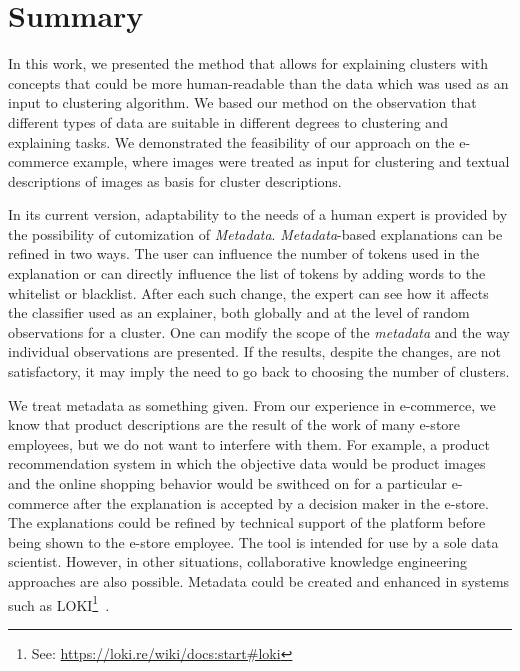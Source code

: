 \documentclass[
 twocolumn,
 hf,
]{ceurart}
\begin{document}
\section{Summary}
\label{sec:summary}
In this work, we presented the method that allows for explaining clusters with concepts that could be more human-readable than the data which was used as an input to clustering algorithm.
We based our method on the observation that different types of data are suitable in different degrees to clustering and explaining tasks.
We demonstrated the feasibility of our approach on the e-commerce example, where images were treated as input for clustering and textual descriptions of images as basis for cluster descriptions.

In its current version, adaptability to the needs of a human expert is provided by the possibility of cutomization of \textit{Metadata}.
\textit{Metadata}-based explanations can be refined in two ways.
The user can influence the number of tokens used in the explanation or can directly influence the list of tokens by adding words to the whitelist or blacklist.
After each such change, the expert can see how it affects the classifier used as an explainer, both globally and at the level of random observations for a cluster.
One can modify the scope of the \textit{metadata} and the way individual observations are presented.
If the results, despite the changes, are not satisfactory, it may imply the need to go back to choosing the number of clusters.

We treat metadata as something given.
From our experience in e-commerce, we know that product descriptions are the result of the work of many e-store employees, but we do not want to interfere with them.
For example, a product recommendation system in which the objective data would be product images and the online shopping behavior would be swithced on for a particular e-commerce after the explanation is accepted by a decision maker in the e-store.
The explanations could be refined by technical support of the platform before being shown to the e-store employee.
The tool is intended for use by a sole data scientist.
However, in other situations, collaborative knowledge engineering approaches are also possible.
Metadata could be created and enhanced in systems such as LOKI\footnote{See: \url{https://loki.re/wiki/docs:start\#loki}}~\cite{Kutt16}.
\end{document}
